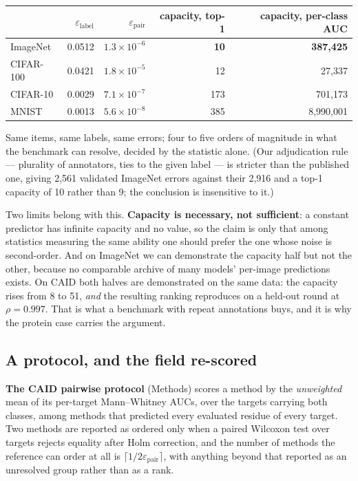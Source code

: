 \documentclass[11pt,a4paper]{article}
\newcommand{\eps}{\varepsilon}
\begin{document}
\begin{center}\small
\begin{tabular}{lrrrr}
\toprule
 & $\eps_{\text{label}}$ & $\eps_{\text{pair}}$ & capacity, top-1 & capacity, per-class AUC \\
\midrule
ImageNet  & 0.0512 & $1.3\times10^{-6}$ & \textbf{10} & \textbf{387,425} \\
CIFAR-100 & 0.0421 & $1.8\times10^{-5}$ & 12 & 27,337 \\
CIFAR-10  & 0.0029 & $7.1\times10^{-7}$ & 173 & 701,173 \\
MNIST     & 0.0013 & $5.6\times10^{-8}$ & 385 & 8,990,001 \\
\bottomrule
\end{tabular}
\end{center}

\noindent
Same items, same labels, same errors; four to five orders of magnitude in what
the benchmark can resolve, decided by the statistic alone. (Our adjudication
rule --- plurality of annotators, ties to the given label --- is stricter than
the published one, giving 2{,}561 validated ImageNet errors against their
2{,}916 and a top-1 capacity of 10 rather than 9; the conclusion is insensitive
to it.)

Two limits belong with this. \textbf{Capacity is necessary, not sufficient}: a
constant predictor has infinite capacity and no value, so the claim is only that
among statistics measuring the same ability one should prefer the one whose
noise is second-order. And on ImageNet we can demonstrate the capacity half but
not the other, because no comparable archive of many models' per-image
predictions exists. On CAID both halves are demonstrated on the same data: the
capacity rises from 8 to 51, \emph{and} the resulting ranking reproduces on a
held-out round at $\rho = 0.997$. That is what a benchmark with repeat
annotations buys, and it is why the protein case carries the argument.

\subsection*{A protocol, and the field re-scored}

\textbf{The CAID pairwise protocol} (Methods) scores a method by the
\emph{unweighted} mean of its per-target Mann--Whitney AUCs, over the targets
carrying both classes, among methods that predicted every evaluated residue of
every target. Two methods are reported as ordered only when a paired Wilcoxon
test over targets rejects equality after Holm correction, and the number of
methods the reference can order at all is
$\lceil 1/2\eps_{\text{pair}} \rceil$, with anything beyond that reported as an
unresolved group rather than as a rank.
\end{document}
